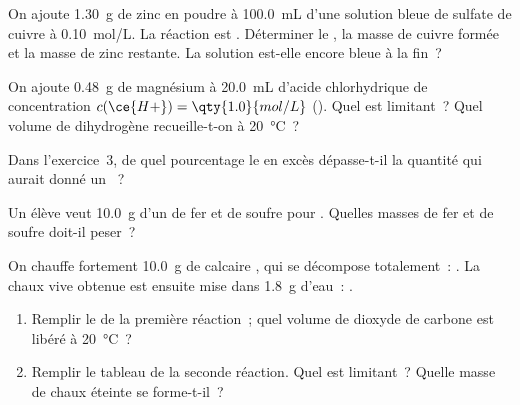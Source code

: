 \begin{exercise}[$\star\star$]\label{exo:g10:reaction-progress-table:9}
On ajoute \qty{1.30}{g} de zinc en poudre à \qty{100.0}{mL} d'une
solution bleue de sulfate de cuivre à \qty{0.10}{mol/L}. La réaction est
.
Déterminer le , la masse de cuivre formée et la masse de
zinc restante. La solution est-elle encore bleue à la fin~?
\end{exercise}

\begin{exercise}[$\star\star$]\label{exo:g10:reaction-progress-table:10}
On ajoute \qty{0.48}{g} de magnésium à \qty{20.0}{mL} d'acide
chlorhydrique de concentration $c(\ce{H+}) = \qty{1.0}{mol/L}$
(). Quel  est limitant~? Quel volume
de dihydrogène recueille-t-on à \qty{20}{\celsius}~?
\end{exercise}

\begin{exercise}[$\star\star$]\label{exo:g10:reaction-progress-table:11}
Dans l'exercice~3, de quel pourcentage le  en excès dépasse-t-il
la quantité qui aurait donné un ~?
\end{exercise}

\begin{exercise}[$\star\star\star$]\label{exo:g10:reaction-progress-table:12}
Un élève veut \qty{10.0}{g} d'un  de fer et de
soufre pour . Quelles masses de fer et de soufre
doit-il peser~?
\end{exercise}

\begin{exercise}[$\star\star\star$]\label{exo:g10:reaction-progress-table:13}
On chauffe fortement \qty{10.0}{g} de calcaire , qui se
décompose totalement~: . La chaux vive 
obtenue est ensuite mise dans \qty{1.8}{g} d'eau~: .
\begin{enumerate}
  \item Remplir le  de la première réaction~; quel
        volume de dioxyde de carbone est libéré à \qty{20}{\celsius}~?
  \item Remplir le tableau de la seconde réaction. Quel  est
        limitant~? Quelle masse de chaux éteinte  se
        forme-t-il~?
\end{enumerate}
\end{exercise}

